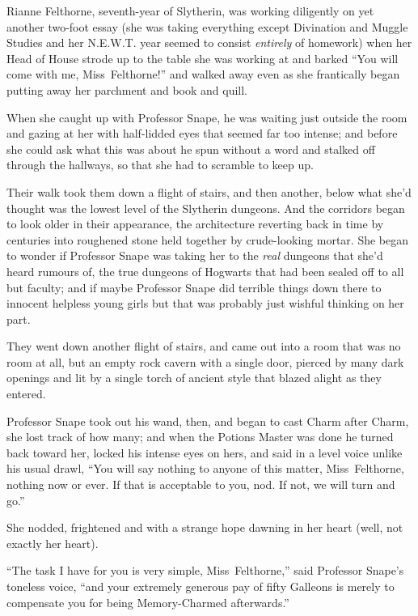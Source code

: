 \later

Rianne Felthorne, seventh-year of Slytherin, was working diligently on yet another two-foot essay (she was taking everything except Divination and Muggle Studies and her N.E.W.T. year seemed to consist \emph{entirely} of homework) when her Head of House strode up to the table she was working at and barked “You will come with me, Miss~Felthorne!” and walked away even as she frantically began putting away her parchment and book and quill.

When she caught up with Professor Snape, he was waiting just outside the room and gazing at her with half-lidded eyes that seemed far too intense; and before she could ask what this was about he spun without a word and stalked off through the hallways, so that she had to scramble to keep up.

Their walk took them down a flight of stairs, and then another, below what she’d thought was the lowest level of the Slytherin dungeons. And the corridors began to look older in their appearance, the architecture reverting back in time by centuries into roughened stone held together by crude-looking mortar. She began to wonder if Professor Snape was taking her to the \emph{real} dungeons that she’d heard rumours of, the true dungeons of Hogwarts that had been sealed off to all but faculty; and if maybe Professor Snape did terrible things down there to innocent helpless young girls but that was probably just wishful thinking on her part.

They went down another flight of stairs, and came out into a room that was no room at all, but an empty rock cavern with a single door, pierced by many dark openings and lit by a single torch of ancient style that blazed alight as they entered.

Professor Snape took out his wand, then, and began to cast Charm after Charm, she lost track of how many; and when the Potions Master was done he turned back toward her, locked his intense eyes on hers, and said in a level voice unlike his usual drawl, “You will say nothing to anyone of this matter, Miss~Felthorne, nothing now or ever. If that is acceptable to you, nod. If not, we will turn and go.”

She nodded, frightened and with a strange hope dawning in her heart (well, not exactly her heart).

“The task I have for you is very simple, Miss~Felthorne,” said Professor Snape’s toneless voice, “and your extremely generous pay of fifty Galleons is merely to compensate you for being Memory-Charmed afterwards.”

